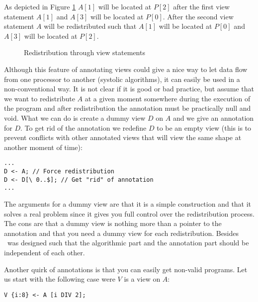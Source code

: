 As depicted in Figure \ref{DynamicAnnot} $A[1]$ will be located at
$P[2]$ after the first view statement $A[1]$ and $A[3]$ will be
located at $P[0]$. After the second view statement $A$ will be
redistributed such that $A[1]$ will be located at $P[0]$ and $A[3]$
will be located at $P[2]$.


\begin{figure}
\begin{center}
\begin{minipage}{0.5\textwidth}
\end{minipage}
\end{center}
\caption{Redistribution through view statements \label{DynamicAnnot}}
\end{figure}

Although this feature of annotating views could give a nice way to let
data flow from one processor to another (systolic algorithms), it can
easily be used in a non-conventional way. It is not clear if it is
good or bad practice, but assume that we want to redistribute $A$ at a
given moment somewhere during the execution of the program and after
redistribution the annotation must be practically null and void. What
we can do is create a dummy view $D$ on $A$ and we give an annotation
for $D$. To get rid of the annotation we redefine $D$ to be an empty
view (this is to prevent conflicts with other annotated views that
will view the same shape at another moment of time):

\begin{verbatim}
...
D <- A; // Force redistribution
D <- D[\ 0..$]; // Get "rid" of annotation
...
\end{verbatim}

The arguments for a dummy view are that it is a simple construction
and that it solves a real problem since it gives you full control over
the redistribution process. The cons are that a dummy view is nothing
more than a pointer to the annotation and that you need a dummy view
for each redistribution. Besides \Booster\ was designed such that the
algorithmic part and the annotation part should be independent of each
other.

Another quirk of annotations is that you can easily get non-valid
programs.  Let us start with the following case were $V$ is a view on
$A$:

\begin{verbatim}
V {i:8} <- A [i DIV 2];
\end{verbatim}

